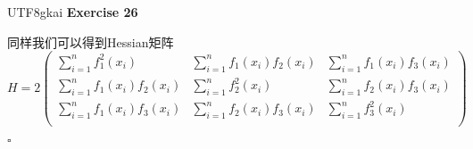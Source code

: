 \documentclass[11pt,hyperref,a4paper,UTF8]{ctexart}
\newenvironment{exercise}[1]{%
{\textbf{Exercise #1} \\ 
    }
}{
  \hfill $\square$ 
  \par\bigskip 
}
\newcommand{\parameter}[1]{\left(#1\right)}
\begin{document}
\begin{CJK}{UTF8}{gkai}
\begin{exercise}{26}
    同样我们可以得到Hessian矩阵
    \[H = 2 \begin{pmatrix}
        \sum_{i = 1}^{n} f_1^2(x_i)&\sum_{i = 1}^{n} f_1(x_i) f_2(x_i)&\sum_{i = 1}^{n} f_1(x_i) f_3(x_i)\\
        \sum_{i = 1}^{n} f_1(x_i) f_2(x_i)&\sum_{i = 1}^{n} f_2^2(x_i)&\sum_{i = 1}^{n} f_2(x_i) f_3(x_i)\\
        \sum_{i = 1}^{n} f_1(x_i) f_3(x_i)&\sum_{i = 1}^{n} f_2(x_i) f_3(x_i)&\sum_{i = 1}^{n} f_3^2(x_i)\\
    \end{pmatrix} \]



\end{exercise}
\end{CJK}
\end{document}
